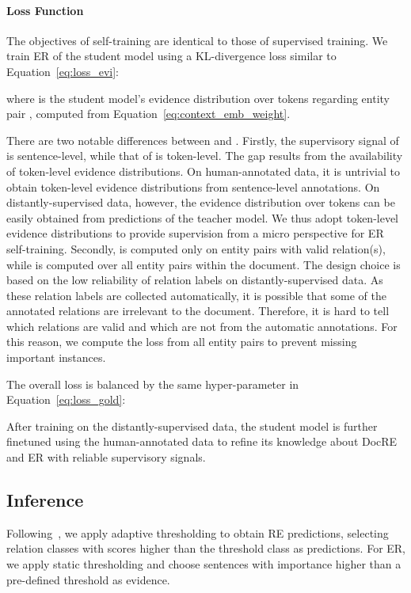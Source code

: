 \documentclass[11pt]{article}
\begin{document}
\paragraph{Loss Function} The objectives of self-training are identical to those of supervised training.
We train ER of the student model using a KL-divergence loss similar to Equation~\ref{eq:loss_evi}:

where  is the student model's evidence distribution over tokens regarding entity pair , computed from Equation~\ref{eq:context_emb_weight}.

There are two notable differences between  and .
Firstly, the supervisory signal of  is sentence-level, while that of  is token-level.
The gap results from the availability of token-level evidence distributions.
On human-annotated data, it is untrivial to obtain token-level evidence distributions from sentence-level annotations.
On distantly-supervised data, however, the evidence distribution over tokens can be easily obtained from predictions of the teacher model.
We thus adopt token-level evidence distributions to provide supervision from a micro perspective for ER self-training.
Secondly,  is computed only on entity pairs with valid relation(s), while  is computed over all entity pairs within the document.
The design choice is based on the low reliability of relation labels on distantly-supervised data.
As these relation labels are collected automatically, it is possible that some of the annotated relations are irrelevant to the document.
Therefore, it is hard to tell which relations are valid and which are not from the automatic annotations.
For this reason, we compute the loss from all entity pairs to prevent missing important instances.


The overall loss is balanced by the same hyper-parameter  in Equation~\ref{eq:loss_gold}:


After training on the distantly-supervised data, the student model is further finetuned using the human-annotated data to refine its knowledge about DocRE and ER with reliable supervisory signals.
\subsection{Inference}

Following~\citet{zhou2021atlop}, we apply adaptive thresholding to obtain RE predictions, selecting relation classes with scores higher than the threshold class as predictions.
For ER, we apply static thresholding and choose sentences with importance higher than a pre-defined threshold as evidence.
\end{document}
